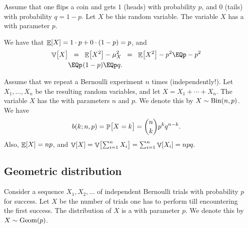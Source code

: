 
\begin{defn}
    Assume that one flips a coin and gets $1$ (heads) with probability
    $p$, and $0$ (tails) with probability $q = 1-p$. Let $X$ be this
    random variable. The variable $X$ has a  with parameter $p$.
    
    We have that $\mathop{\mathbb{E}}\!\left[ { X} \right] = 1\cdot p + 0 \cdot(1-p) = p$, and
    \begin{align*}
        \Var{\bigl. X}%
        &\EQ%
        \Ex{X^2} - \mu_X^2%
        \EQ%
        \Ex{X^2} - p^2%
        \EQ%
        p - p^2
        \\&
        \EQ%
        p \ts (1-p)%
        \EQ%
        p q.
    \end{align*}
\end{defn}

\begin{defn}
    Assume that we repeat a Bernoulli experiment $n$ times
    (independently!). Let $X_1, \ldots, X_n$ be the resulting random
    variables, and let $X = X_1 + \cdots + X_n$. The variable $X$ has the
     with parameters $n$ and $p$. We denote
    this by $X \sim \DistBinom{n}{p}$. We have
    \begin{align*}
      b(k;n,p)%
      =%
      \Prob{ \bigl. X = k } = \binom{n}{k} p^{k} q^{n-k}.
    \end{align*}
    Also, $\mathop{\mathbb{E}}\!\left[ { X } \right] = n p$, and
    \begin{math}
        \Var{ X}%
        =%
        \Var{ \bigl. \sum_{i=1}^n X_i }%
        =%
        \sum_{i=1}^n \Var{ X_i }%
        = n p q.
    \end{math}
\end{defn}


\subsection{Geometric distribution}

\begin{defn}
    Consider a sequence $X_1,X_2, \ldots $ of independent Bernoulli
    trials with probability $p$ for success. Let $X$ be the number of
    trials one has to perform till encountering the first success. The
    distribution of $X$ is a  with
    parameter $p$. We denote this by $X \sim \DistGeom{p}$.
\end{defn}

